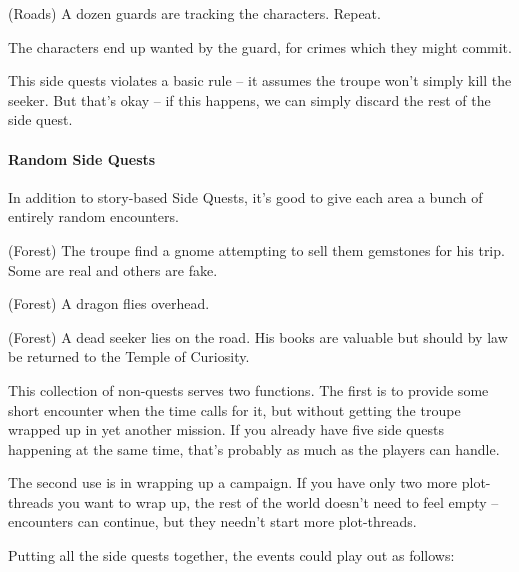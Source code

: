 \begin{multicols}{2}
\begin{exampletext}
\begin{list}{\sqn}{}
  \item
  (Roads) A dozen guards are tracking the characters. Repeat.

\end{list}

The characters end up wanted by the \gls{guard}, for crimes which they might commit.

\end{exampletext}

This side quests violates a basic rule -- it assumes the troupe won't simply kill the \gls{seeker}.
But that's okay  -- if this happens, we can simply discard the rest of the side quest.

\paragraph{Random Side Quests}

In addition to story-based Side Quests, it's good to give each area a bunch of entirely random encounters.

\begin{list}{\sqn}{}

  \item{(Forest) The troupe find a gnome attempting to sell them gemstones for his trip. Some are real and others are fake.}

  \item{(Forest) A dragon flies overhead.}

  \item
  (Forest) A dead \gls{seeker} lies on the road.
  His books are valuable but should by law be returned to the Temple of Curiosity.

\end{list}

\noindent
This collection of non-quests serves two functions.
The first is to provide some short encounter when the time calls for it, but without getting the troupe wrapped up in yet another mission.
If you already have five side quests happening at the same time, that's probably as much as the players can handle.

The second use is in wrapping up a campaign.
If you have only two more plot-threads you want to wrap up, the rest of the world doesn't need to feel empty -- encounters can continue, but they needn't start more plot-threads.

Putting all the side quests together, the events could play out as follows:


\end{multicols}
